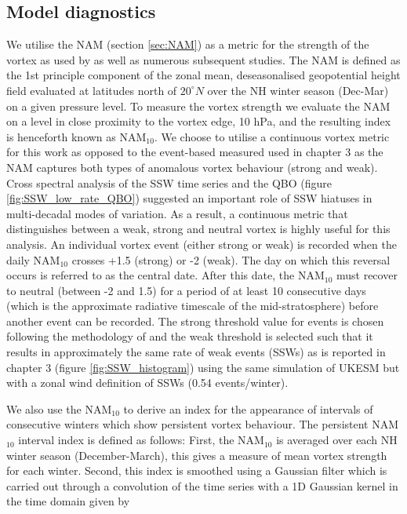\subsection{Model diagnostics}
\label{sec:model_diagnostics_surface}
We utilise the NAM (section \ref{sec:NAM}) as a metric for the strength of the vortex as used by \cite{baldwinStratospheric2001a} as well as numerous subsequent studies. The NAM is defined as the 1st principle component of the zonal mean, deseasonalised geopotential height field evaluated at latitudes north of $20^{\circ}N$ over the NH winter season (Dec-Mar) on a given pressure level. To measure the vortex strength we evaluate the NAM on a level in close proximity to the vortex edge, 10 hPa, and the resulting index is henceforth known as NAM$_{10}$. We choose to utilise a continuous vortex metric for this work as opposed to the event-based measured used in chapter 3 as the NAM captures both types of anomalous vortex behaviour (strong and weak). Cross spectral analysis of the SSW time series and the QBO (figure \ref{fig:SSW_low_rate_QBO}) suggested an important role of SSW hiatuses in multi-decadal modes of variation. As a result, a continuous metric that distinguishes between a weak, strong and neutral vortex is highly useful for this analysis. An individual vortex event (either strong or weak) is recorded when the daily NAM$_{10}$ crosses +1.5 (strong) or -2 (weak). The day on which this reversal occurs is referred to as the central date. After this date, the NAM$_{10}$ must recover to neutral (between -2 and 1.5) for a period of at least 10 consecutive days (which is the approximate radiative timescale of the mid-stratosphere) before another event can be recorded. The strong threshold value for events is chosen following the methodology of \cite{baldwinStratospheric2001a} and the weak threshold is selected such that it results in approximately the same rate of weak events (SSWs) as is reported in chapter 3 (figure \ref{fig:SSW_histogram}) using the same simulation of UKESM but with a zonal wind definition of SSWs (0.54 events/winter).

We also use the NAM$_{10}$ to derive an index for the appearance of intervals of consecutive winters which show persistent vortex behaviour. The persistent NAM$_{10}$ interval index is defined as follows: First, the NAM$_{10}$ is averaged over each NH winter season (December-March), this gives a measure of mean vortex strength for each winter. Second, this index is smoothed using a Gaussian filter which is carried out through a convolution of the time series with a 1D Gaussian kernel in the time domain given by

